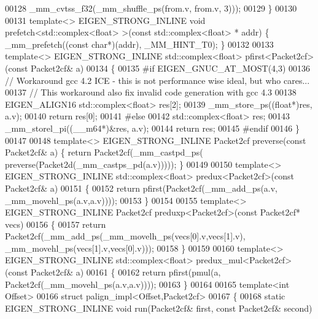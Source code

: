 \begin{DoxyCode}
00128                                      \_mm\_cvtss\_f32(\_mm\_shuffle\_ps(from.v, from.v, 3)));
00129 \}
00130 
00131 \textcolor{keyword}{template}<> EIGEN\_STRONG\_INLINE \textcolor{keywordtype}{void} prefetch<std::complex<float> >(\textcolor{keyword}{const} std::complex<float> *   addr) \{ 
      \_mm\_prefetch((\textcolor{keyword}{const} \textcolor{keywordtype}{char}*)(addr), \_MM\_HINT\_T0); \}
00132 
00133 \textcolor{keyword}{template}<> EIGEN\_STRONG\_INLINE std::complex<float>  pfirst<Packet2cf>(\textcolor{keyword}{const} Packet2cf& a)
00134 \{
00135 \textcolor{preprocessor}{  #if EIGEN\_GNUC\_AT\_MOST(4,3)}
00136   \textcolor{comment}{// Workaround gcc 4.2 ICE - this is not performance wise ideal, but who cares...}
00137   \textcolor{comment}{// This workaround also fix invalid code generation with gcc 4.3}
00138   EIGEN\_ALIGN16 std::complex<float> res[2];
00139   \_mm\_store\_ps((\textcolor{keywordtype}{float}*)res, a.v);
00140   \textcolor{keywordflow}{return} res[0];
00141 \textcolor{preprocessor}{  #else}
00142   std::complex<float> res;
00143   \_mm\_storel\_pi((\_\_m64*)&res, a.v);
00144   \textcolor{keywordflow}{return} res;
00145 \textcolor{preprocessor}{  #endif}
00146 \}
00147 
00148 \textcolor{keyword}{template}<> EIGEN\_STRONG\_INLINE Packet2cf preverse(\textcolor{keyword}{const} Packet2cf& a) \{ \textcolor{keywordflow}{return} Packet2cf(\_mm\_castpd\_ps(
      preverse(Packet2d(\_mm\_castps\_pd(a.v))))); \}
00149 
00150 \textcolor{keyword}{template}<> EIGEN\_STRONG\_INLINE std::complex<float> predux<Packet2cf>(\textcolor{keyword}{const} Packet2cf& a)
00151 \{
00152   \textcolor{keywordflow}{return} pfirst(Packet2cf(\_mm\_add\_ps(a.v, \_mm\_movehl\_ps(a.v,a.v))));
00153 \}
00154 
00155 \textcolor{keyword}{template}<> EIGEN\_STRONG\_INLINE Packet2cf preduxp<Packet2cf>(\textcolor{keyword}{const} Packet2cf* vecs)
00156 \{
00157   \textcolor{keywordflow}{return} Packet2cf(\_mm\_add\_ps(\_mm\_movelh\_ps(vecs[0].v,vecs[1].v), \_mm\_movehl\_ps(vecs[1].v,vecs[0].v)));
00158 \}
00159 
00160 \textcolor{keyword}{template}<> EIGEN\_STRONG\_INLINE std::complex<float> predux\_mul<Packet2cf>(\textcolor{keyword}{const} Packet2cf& a)
00161 \{
00162   \textcolor{keywordflow}{return} pfirst(pmul(a, Packet2cf(\_mm\_movehl\_ps(a.v,a.v))));
00163 \}
00164 
00165 \textcolor{keyword}{template}<\textcolor{keywordtype}{int} Offset>
00166 \textcolor{keyword}{struct }palign\_impl<Offset,Packet2cf>
00167 \{
00168   \textcolor{keyword}{static} EIGEN\_STRONG\_INLINE \textcolor{keywordtype}{void} run(Packet2cf& first, \textcolor{keyword}{const} Packet2cf& second)

\end{DoxyCode}
